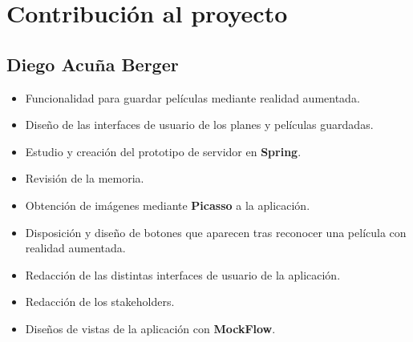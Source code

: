 
\cleardoublepage


\chapter{Contribución al proyecto}
\label{makereference7}

\section{Diego Acuña Berger}
\label{makereference7.1}
\begin{itemize}
    \item Funcionalidad para guardar películas mediante realidad aumentada.
    \item Diseño de las interfaces de usuario de los planes y películas guardadas.  
    \item Estudio y creación del prototipo de servidor en \textbf{Spring}.
    \item Revisión de la memoria.
    \item Obtención de imágenes mediante \textbf{Picasso} a la aplicación.
    \item Disposición y diseño de botones que aparecen tras reconocer una película con realidad aumentada.
    \item Redacción de las distintas interfaces de usuario de la aplicación.
    \item Redacción de los stakeholders.
    \item Diseños de vistas de la aplicación con \textbf{MockFlow}.
\end{itemize}
